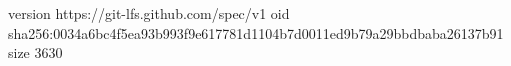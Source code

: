 version https://git-lfs.github.com/spec/v1
oid sha256:0034a6bc4f5ea93b993f9e617781d1104b7d0011ed9b79a29bbdbaba26137b91
size 3630
